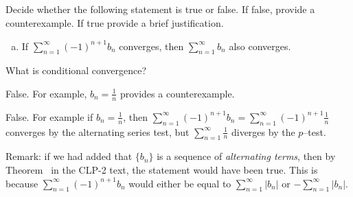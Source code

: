 %
%

\subsection*{\Conceptual}

\begin{question}[2015A]
Decide whether the following statement is true or false.
If false, provide a counterexample. If true provide a brief justification.

\begin{enumerate}[(a)]
\item []\color{blue}
If $\displaystyle\sum_{n=1}^{\infty}(-1)^{n+1}b_n$ converges, then $\displaystyle\sum_{n=1}^{\infty} b_n$ also converges.
\end{enumerate}
\end{question}

\begin{hint}
What is conditional convergence?
\end{hint}

\begin{answer}
False. For example, $b_n=\frac{1}{n}$ provides a counterexample.
\end{answer}

\begin{solution}
False. For example if $b_n=\frac{1}{n}$, then
$\sum\limits_{n=1}^{\infty}(-1)^{n+1}b_n
   =\sum\limits_{n=1}^{\infty}(-1)^{n+1}\frac{1}{n}$
converges by the alternating series test, but
$\sum\limits_{n=1}^{\infty} \frac{1}{n}$ diverges by the $p$--test.

Remark: if we had added that $\{b_n\}$ is a sequence of \emph{alternating terms}, then by Theorem~ in the CLP-2 text, the statement would have been true. This is because $\displaystyle\sum_{n=1}^{\infty}(-1)^{n+1}b_n$ would either be equal to $\displaystyle\sum_{n=1}^{\infty} |b_n|$ or $-\displaystyle\sum_{n=1}^{\infty} |b_n|$.
\end{solution}


